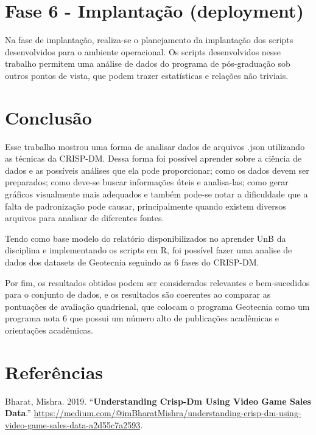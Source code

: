 \documentclass[]{article}
\begin{document}
\hypertarget{fase-6---implantauxe7uxe3o-deployment}{%
\section{Fase 6 - Implantação
(deployment)}\label{fase-6---implantauxe7uxe3o-deployment}}

Na fase de implantação, realiza-se o planejamento da implantação dos
scripts desenvolvidos para o ambiente operacional. Os scripts
desenvolvidos nesse trabalho permitem uma análise de dados do programa
de pós-graduação sob outros pontos de vista, que podem trazer
estatísticas e relações não triviais.

\hypertarget{conclusuxe3o}{%
\section{Conclusão}\label{conclusuxe3o}}

Esse trabalho mostrou uma forma de analisar dados de arquivos .json
utilizando as técnicas da CRISP-DM. Dessa forma foi possível aprender
sobre a ciência de dados e as possíveis análises que ela pode
proporcionar; como os dados devem ser preparados; como deve-se buscar
informações úteis e analisa-las; como gerar gráficos visualmente mais
adequados e também pode-se notar a dificuldade que a falta de
padronização pode causar, principalmente quando existem diversos
arquivos para analisar de diferentes fontes.

Tendo como base modelo do relatório disponibilizados no aprender UnB da
disciplina e implementando os scripts em R, foi possível fazer uma
analise de dados dos datasets de Geotecnia seguindo as 6 fases do
CRISP-DM.

Por fim, os resultados obtidos podem ser considerados relevantes e
bem-sucedidos para o conjunto de dados, e os resultados são coerentes ao
comparar as pontuações de avaliação quadrienal, que colocam o programa
Geotecnia como um programa nota 6 que possui um número alto de
publicações acadêmicas e orientações acadêmicas.

\hypertarget{referuxeancias}{%
\section*{Referências}\label{referuxeancias}}

\hypertarget{refs}{}
\leavevmode\hypertarget{ref-bharat_crispdm_2019}{}%
Bharat, Mishra. 2019. ``\textbf{Understanding Crisp-Dm Using Video Game
Sales Data}.''
\url{https://medium.com/@imBharatMishra/understanding-crisp-dm-using-video-game-sales-data-a2d55c7a2593}.
\end{document}
